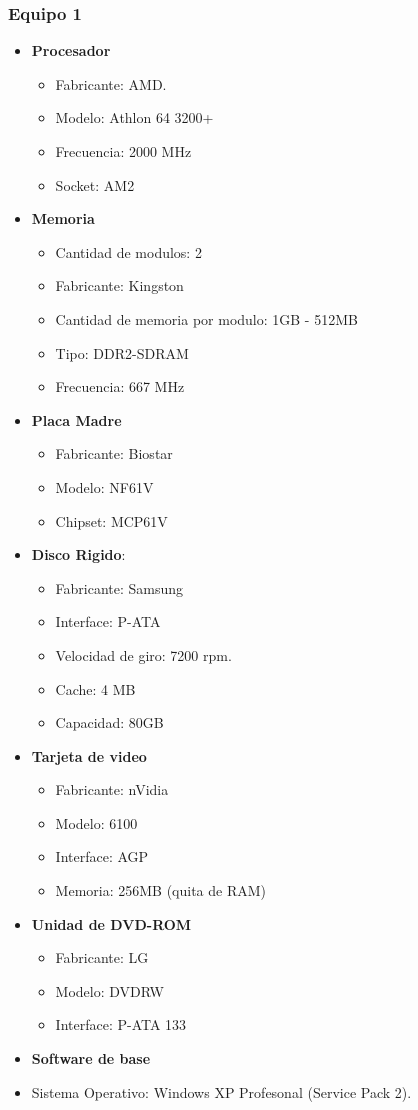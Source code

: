 \subsubsection{Equipo 1}
\begin{itemize}
\item \textbf{Procesador}
	\begin{itemize}
	\item Fabricante: AMD.	
	\item Modelo: Athlon 64 3200+
	\item Frecuencia: 2000 MHz
	\item Socket: AM2
	\end{itemize}
\item \textbf{Memoria}
	\begin{itemize}
	\item Cantidad de modulos: 2
	\item Fabricante: Kingston
	\item Cantidad de memoria por modulo: 1GB - 512MB
	\item Tipo: DDR2-SDRAM
	\item Frecuencia: 667 MHz
	\end{itemize}
\item \textbf{Placa Madre}
	\begin{itemize}
	\item Fabricante: Biostar 
	\item Modelo: NF61V
	\item Chipset: MCP61V
	\end{itemize}
\item \textbf{Disco Rigido}:
	\begin{itemize}
	\item Fabricante: Samsung
	\item Interface: P-ATA
	\item Velocidad de giro: 7200 rpm.
	\item Cache: 4 MB
	\item Capacidad: 80GB
	\end{itemize}
\item \textbf{Tarjeta de video}
	\begin{itemize}
	\item Fabricante: nVidia
	\item Modelo: 6100 
	\item Interface: AGP
	\item Memoria: 256MB (quita de RAM)
	\end{itemize}
\item \textbf{Unidad de DVD-ROM}
	\begin{itemize}
	\item Fabricante: LG
	\item Modelo: DVDRW
	\item Interface: P-ATA 133
	\end{itemize}
\item \textbf{Software de base}
	\item Sistema Operativo: Windows XP Profesonal (Service Pack 2).
\end{itemize} 
 

